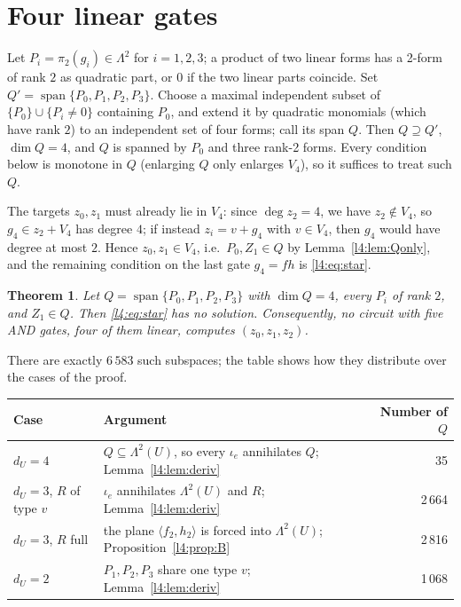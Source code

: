 \documentclass[11pt,a4paper]{article}
\theoremstyle{plain}
\newtheorem{theorem}{Theorem}
\theoremstyle{remark}
\newcommand{\Span}{\operatorname{span}}
\newcommand{\Lam}{\Lambda^2}
\newcommand{\dU}{d_U}
\begin{document}
\section{Four linear gates}\label{sec:lambda4}

Let $P_i=\pi_2(g_i)\in\Lam$ for $i=1,2,3$; a product of two linear forms has a 2-form of rank $2$ as quadratic part, or $0$ if the two linear parts coincide. Set $Q'=\Span\{P_0,P_1,P_2,P_3\}$. Choose a maximal independent subset of $\{P_0\}\cup\{P_i\ne0\}$ containing $P_0$, and extend it by quadratic monomials (which have rank $2$) to an independent set of four forms; call its span $Q$. Then $Q\supseteq Q'$, $\dim Q=4$, and $Q$ is spanned by $P_0$ and three rank-2 forms. Every condition below is monotone in $Q$ (enlarging $Q$ only enlarges $V_4$), so it suffices to treat such $Q$.


The targets $z_0,z_1$ must already lie in $V_4$: since $\deg z_2=4$, we have $z_2\notin V_4$, so $g_4\in z_2+V_4$ has degree $4$; if instead $z_i=v+g_4$ with $v\in V_4$, then $g_4$ would have degree at most $2$. Hence $z_0,z_1\in V_4$, i.e.\ $P_0,Z_1\in Q$ by Lemma~\ref{l4:lem:Qonly}, and the remaining condition on the last gate $g_4=fh$ is
\eqref{l4:eq:star}.


\begin{theorem}\label{l4:thm:main}
Let $Q=\Span\{P_0,P_1,P_2,P_3\}$ with $\dim Q=4$, every $P_i$ of rank $2$, and $Z_1\in Q$. Then \eqref{l4:eq:star} has no solution. Consequently, no circuit with five AND gates, four of them linear, computes $(z_0,z_1,z_2)$.
\end{theorem}

There are exactly $6\,583$ such subspaces; the table shows how they distribute over the cases of the proof.

\begin{center}
\begin{tabularx}{0.95\textwidth}{@{}l X r@{}}
\toprule
Case & Argument & Number of $Q$ \\
\midrule
$\dU=4$ & $Q\subseteq\Lam(U)$, so every $\iota_e$ annihilates $Q$; Lemma~\ref{l4:lem:deriv} & 35\\
$\dU=3$, $R$ of type $v$ & $\iota_e$ annihilates $\Lam(U)$ and $R$; Lemma~\ref{l4:lem:deriv} & 2\,664\\
$\dU=3$, $R$ full & the plane $\langle f_2,h_2\rangle$ is forced into $\Lam(U)$; Proposition~\ref{l4:prop:B} & 2\,816\\
$\dU=2$ & $P_1,P_2,P_3$ share one type $v$; Lemma~\ref{l4:lem:deriv} & 1\,068\\
\bottomrule
\end{tabularx}
\end{center}
\end{document}
